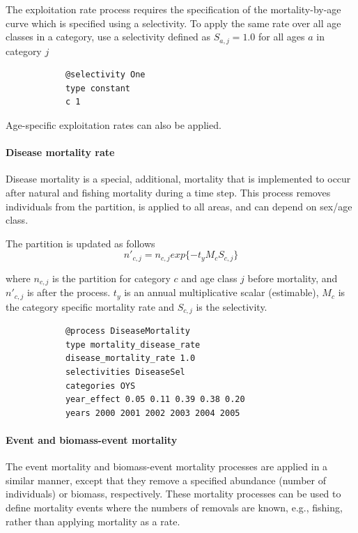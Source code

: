The exploitation rate process requires the specification of the mortality-by-age curve which is specified using a selectivity. To apply the same rate over all age classes in a category, use a selectivity defined as $S_{a,j}=1.0$ for all ages $a$ in category $j$

{\small{\begin{verbatim}
			@selectivity One
			type constant
			c 1
\end{verbatim}}}

Age-specific exploitation rates can also be applied.

\paragraph{Disease mortality rate}\label{sec:Process-Age-DiseaseMortalityRate}\label{sec:Process-MortalityDiseaseRate}

Disease mortality is a special, additional, mortality that is implemented to occur after natural and fishing mortality during a time step. This process removes individuals from the partition, is applied to all areas, and can depend on sex/age class.

The partition is updated as follows
\begin{equation}
	n'_{c,j} = n_{c,j}  exp\{-t_y M_{c} S_{c,j} \}
\end{equation}

where \(n_{c,j}\) is the partition for category \(c\) and age class \(j\) before mortality, and \(n'_{c,j}\)  is after the process. \(t_y\) is an annual multiplicative scalar (estimable), \(M_{c}\) is the category specific mortality rate and \(S_{c,j}\) is the selectivity.

{\small{\begin{verbatim}
			@process DiseaseMortality
			type mortality_disease_rate
			disease_mortality_rate 1.0
			selectivities DiseaseSel 
			categories OYS
			year_effect 0.05 0.11 0.39 0.38 0.20 
			years 2000 2001 2002 2003 2004 2005 
\end{verbatim}}}

\paragraph{Event and biomass-event mortality}\label{sec:Process-MortalityEvent}\label{sec:Process-MortalityEventBiomass} 


The event mortality and biomass-event mortality processes are applied in a similar manner, except that they remove a specified abundance (number of individuals) or biomass, respectively. These mortality processes can be used to define mortality events where the numbers of removals are known, e.g., fishing, rather than applying mortality as a rate.

